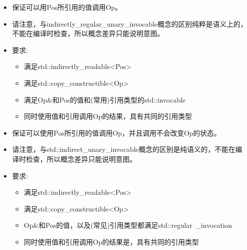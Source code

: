 

\begin{itemize}
\item
保证可以用Pos所引用的值调用Op。

\item
请注意，与indirectly\_regular\_unary\_invocable概念的区别纯粹是语义上的，不能在编译时检查，所以概念差异只能说明意图。

\item
要求:
\begin{itemize}
\item
满足std::indirectly\_readable<Pos>

\item
满足std::copy\_constructible<Op>

\item
满足Op\&和Pos的值和(常用)引用类型的std::invocable

\item
同时使用值和引用调用Op的结果，具有共同的引用类型
\end{itemize}
\end{itemize}


\begin{itemize}
\item
保证可以使用Pos所引用的值调用Op，并且调用不会改变Op的状态。

\item
请注意，与std::indirect\_unary\_invocable概念的区别是纯语义的，不能在编译时检查，所以概念差异只能说明意图。

\item
要求:
\begin{itemize}
\item
满足std::indirectly\_readable<Pos>

\item
满足std::copy\_constructible<Op>

\item
Op\&和Pos的值，以及(常见)引用类型都满足std::regular\ _invocation

\item
同时使用值和引用调用Op的结果是，具有共同的引用类型
\end{itemize}
\end{itemize}


